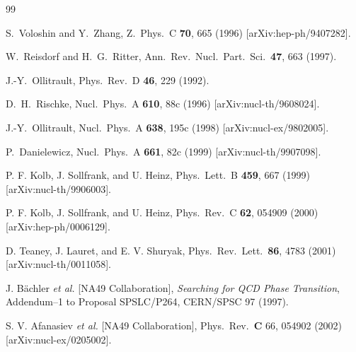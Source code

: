 \documentclass[aps,prc,superscriptaddress,showpacs,floatfix,nofootinbib]{revtex4}
\begin{document}
\begin{thebibliography}{99}

S.~Voloshin and Y.~Zhang,
Z.\ Phys.\ C {\bf 70}, 665 (1996)
[arXiv:hep-ph/9407282].

W.~Reisdorf and H.~G.~Ritter,
Ann.\ Rev.\ Nucl.\ Part.\ Sci.\  {\bf 47}, 663 (1997).

J.-Y.~Ollitrault,
Phys.\ Rev.\ D {\bf 46}, 229 (1992).

D.~H.~Rischke,
Nucl.\ Phys.\ A {\bf 610}, 88c (1996)
[arXiv:nucl-th/9608024].

J.-Y.~Ollitrault,
Nucl.\ Phys.\ A {\bf 638}, 195c (1998)
[arXiv:nucl-ex/9802005].

P.~Danielewicz,
Nucl.\ Phys.\ A {\bf 661}, 82c (1999)
[arXiv:nucl-th/9907098].

P. F. Kolb, J. Sollfrank, and U. Heinz,
Phys.\ Lett.\ B {\bf 459}, 667 (1999)
[arXiv:nucl-th/9906003].

P. F. Kolb, J. Sollfrank, and U. Heinz,
Phys.\ Rev.\ C {\bf 62}, 054909 (2000)
[arXiv:hep-ph/0006129].

D. Teaney, J. Lauret, and E. V. Shuryak,
Phys.\ Rev.\ Lett.\  {\bf 86}, 4783 (2001)
[arXiv:nucl-th/0011058].

J. B\"achler {\it et al.} [NA49 Collaboration],
{\it Searching for QCD Phase Transition},
Addendum--1 to Proposal SPSLC/P264, CERN/SPSC 97 (1997).

S. V. Afanasiev  {\it et al.}  [NA49 Collaboration],
Phys.\ Rev.\ {\bf C} 66, 054902 (2002)
[arXiv:nucl-ex/0205002].


\end{thebibliography}
\end{document}
